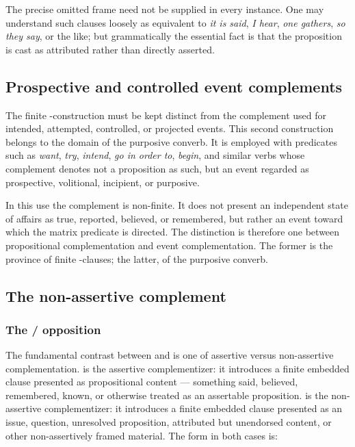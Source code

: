 The precise omitted frame need not be supplied in every instance. One may
understand such clauses loosely as equivalent to \textit{it is said},
\textit{I hear}, \textit{one gathers}, \textit{so they say}, or the like;
but grammatically the essential fact is that the proposition is cast as
attributed rather than directly asserted.

\subsection{Prospective and controlled event complements}

The finite -construction must be kept distinct from the complement
used for intended, attempted, controlled, or projected events. This second
construction belongs to the domain of the purposive converb. It is employed
with predicates such as \textit{want}, \textit{try}, \textit{intend},
\textit{go in order to}, \textit{begin}, and similar verbs whose complement
denotes not a proposition as such, but an event regarded as prospective,
volitional, incipient, or purposive.

In this use the complement is non-finite. It does not present an independent
state of affairs as true, reported, believed, or remembered, but rather an
event toward which the matrix predicate is directed. The distinction is
therefore one between propositional complementation and event
complementation. The former is the province of finite -clauses; the
latter, of the purposive converb.

\subsection{The non-assertive complement }\label{sec:poby}

\subsubsection{The  /  opposition}

The fundamental contrast between  and  is one of assertive
versus non-assertive complementation.  is the assertive
complementizer: it introduces a finite embedded clause presented as
propositional content --- something said, believed, remembered, known, or
otherwise treated as an assertable proposition.  is the
non-assertive complementizer: it introduces a finite embedded clause presented
as an issue, question, unresolved proposition, attributed but unendorsed
content, or other non-assertively framed material. The form in both cases is:

